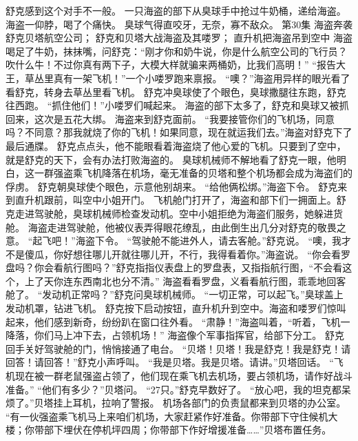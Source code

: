 \documentclass[a4paper,12pt,UTF8,twoside]{ctexbook}
\begin{document}
        舒克感到这个对手不一般。 
        一只海盗的部下从臭球手中抢过牛奶桶，递给海盗。海盗一仰脖，喝了个痛快。 
        臭球气得直咬牙，无奈，寡不敌众。   第30集 
        海盗奔袭舒克贝塔航空公司； 
        舒克和贝塔大战海盗及其喽罗； 
        直升机把海盗吊到空中   
        海盗喝足了牛奶，抹抹嘴，问舒克：“刚才你和奶牛说，你是什么航空公司的飞行员？吹什么牛！不过你真有两下子，大模大样就骗来两桶奶，比我们高明！” 
        “报告大王，草丛里真有一架飞机！”一个小喽罗跑来禀报。 
        “噢？”海盗用异样的眼光看了看舒克，转身去草丛里看飞机。 
        舒克冲臭球使了个眼色，臭球撒腿往东跑，舒克往西跑。 
        “抓住他们！”小喽罗们喊起来。 
        海盗的部下太多了，舒克和臭球又被抓回来，这次是五花大绑。 
        海盗来到舒克面前。 
        “我要接管你们的飞机场，同意吗？不同意？那我就烧了你的飞机！如果同意，现在就运我们去。”海盗对舒克下了最后通牒。 
        舒克点点头，他不能眼看着海盗烧了他心爱的飞机。只要到了空中，就是舒克的天下，会有办法打败海盗的。 
        臭球机械师不解地看了舒克一眼，他明白，这一群强盗乘飞机降落在机场，毫无准备的贝塔和整个机场都会成为海盗们的俘虏。 
        舒克朝臭球使个眼色，示意他别胡来。 
        “给他俩松绑。”海盗下令。 
        舒克来到直升机跟前，叫空中小姐开门。 
        飞机舱门打开了，海盗和部下们一拥面上。舒克走进驾驶舱，臭球机械师检查发动机。空中小姐拒绝为海盗们服务，她躲进货舱。 
        海盗走进驾驶舱，他被仪表弄得眼花缭乱，由此倒生出几分对舒克的敬畏之意。 
        “起飞吧！”海盗下令。 
        “驾驶舱不能进外人，请去客舱。”舒克说。 
        “噢，我才不是傻瓜，你好想往哪儿开就往哪儿开，不行，我得看着你。”海盗说。 
        “你会看罗盘吗？你会看航行图吗？”舒克指指仪表盘上的罗盘表，又指指航行图，“不会看这个，上了天你连东西南北也分不清。” 
        海盗看看罗盘，义看看航行图，乖乖地回客舱了。 
        “发动机正常吗？”舒克问臭球机械师。 
        “一切正常，可以起飞。”臭球盖上发动机罩，钻进飞机。 
        舒克按下启动按钮，直升机升到空中。海盗和喽罗们惊叫起来，他们感到新奇，纷纷趴在窗口往外看。 
        “肃静！”海盗叫着，“听着，飞机一降落，你们马上冲下去，占领机场！” 
        海盗像个军事指挥官，给部下分工。 
        舒克回手关好驾驶舱的门，悄悄接通了电台。 
        “贝塔！贝塔！我是舒克！我是舒克！请回答！请回答！”舒克小声呼叫。 
        “我是贝塔。我是贝塔。请讲。”贝塔回话。 
        “飞机现在被一群老鼠强盗占领了，他们现在乘飞机去机场，要占领机场，请作好战斗准备。” 
        “他们有多少？”贝塔问。 
        “27只。”舒克早数好了。 
        “放心吧，我的坦克都呆烦了。”贝塔挂上耳机，拉响了警报。 
        机场各部门的负责鼠都来到贝塔的办公室。 
        “有一伙强盗乘飞机马上来咱们机场，大家赶紧作好准备。你带部下守住候机大楼；你带部下埋伏在停机坪四周；你带部下作好增援准备……”贝塔布置任务。 
\end{document}
